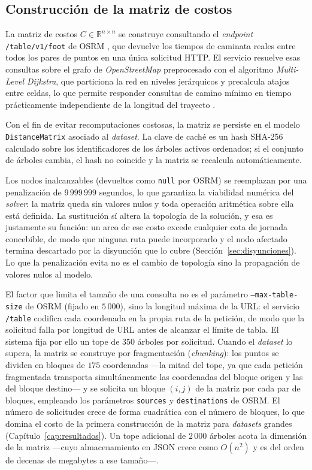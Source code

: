 \subsection{Construcción de la matriz de costos}
\label{sec:matriz}

La matriz de costos $C \in \mathbb{R}^{n \times n}$ se construye consultando el
\textit{endpoint} \texttt{/table/v1/foot} de OSRM \citep{osrm}, que devuelve los
tiempos de caminata reales entre todos los pares de puntos en una única solicitud
HTTP. El servicio resuelve esas consultas sobre el grafo de \textit{OpenStreetMap}
preprocesado con el algoritmo \textit{Multi-Level Dijkstra}, que particiona la red en
niveles jerárquicos y precalcula atajos entre celdas, lo que permite responder
consultas de camino mínimo en tiempo prácticamente independiente de la longitud del
trayecto \citep{delling2017customizable}.

Con el fin de evitar recomputaciones costosas, la matriz se persiste en el modelo
\texttt{DistanceMatrix} asociado al \textit{dataset}.
La clave de caché es un hash SHA-256 calculado sobre los identificadores de los
árboles activos ordenados; si el conjunto de árboles cambia, el hash no coincide
y la matriz se recalcula automáticamente.

Los nodos inalcanzables (devueltos como \texttt{null} por OSRM) se reemplazan por
una penalización de $9\,999\,999$ segundos, lo que garantiza la viabilidad numérica
del \textit{solver}: la matriz queda sin valores nulos y toda operación aritmética
sobre ella está definida. La sustitución sí altera la topología de la solución, y esa
es justamente su función: un arco de ese costo excede cualquier cota de jornada
concebible, de modo que ninguna ruta puede incorporarlo y el nodo afectado termina
descartado por la disyunción que lo cubre (Sección~\ref{sec:disyunciones}). Lo que la
penalización evita no es el cambio de topología sino la propagación de valores nulos
al modelo.

El factor que limita el tamaño de una consulta no es el parámetro
\texttt{--max-table-size} de OSRM (fijado en $5\,000$), sino la longitud máxima de
la URL: el servicio \texttt{/table} codifica cada coordenada en la propia ruta de la
petición, de modo que la solicitud falla por longitud de URL antes de alcanzar el
límite de tabla. El sistema fija por ello un tope de $350$ árboles por solicitud.
Cuando el \textit{dataset} lo supera, la matriz se construye por fragmentación
(\textit{chunking}): los puntos se dividen en bloques de $175$ coordenadas
---la mitad del tope, ya que cada petición fragmentada transporta simultáneamente
las coordenadas del bloque origen y las del bloque destino--- y se solicita un
bloque $(i,j)$ de la matriz por cada par de bloques, empleando los parámetros
\texttt{sources} y \texttt{destinations} de OSRM. El número de solicitudes crece
de forma cuadrática con el número de bloques, lo que domina el costo de la primera
construcción de la matriz para \textit{datasets} grandes
(Capítulo~\ref{cap:resultados}). Un tope adicional de $2\,000$ árboles acota la
dimensión de la matriz ---cuyo almacenamiento en JSON crece como $O(n^2)$ y es del
orden de decenas de megabytes a ese tamaño---.

